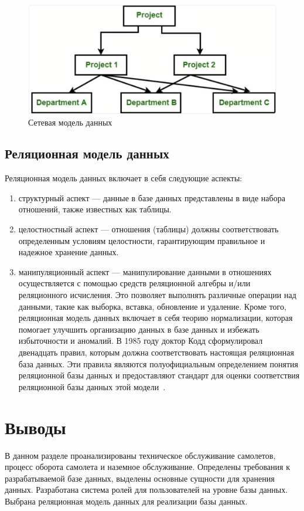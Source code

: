 \begin{enumerate}[label=\arabic*.]
    \begin{figure}[h]
        \begin{center}
            \includegraphics[scale=0.3]{inc/network-model}
            \caption{Сетевая модель данных}
            \label{fig:network-model}
        \end{center}
    \end{figure}
\end{enumerate}

\subsection{Реляционная модель данных}
Реляционная модель данных включает в себя следующие аспекты:

\begin{enumerate}[label=\arabic*)]
    \item структурный аспект --- данные в базе данных представлены в виде набора отношений, также известных как таблицы.
    \item целостностный аспект --- отношения (таблицы) должны соответствовать определенным условиям целостности, гарантирующим правильное и надежное хранение данных.
    \item манипуляционный аспект --- манипулирование данными в отношениях осуществляется с помощью средств реляционной алгебры и/или реляционного исчисления.
    Это позволяет выполнять различные операции над данными, такие как выборка, вставка, обновление и удаление.
    Кроме того, реляционная модель данных включает в себя теорию нормализации, которая помогает улучшить организацию данных в базе данных и избежать избыточности и аномалий.
    В 1985 году доктор Кодд сформулировал двенадцать правил, которым должна соответствовать настоящая реляционная база данных.
    Эти правила являются полуофициальным определением понятия реляционной базы данных и предоставляют стандарт для оценки соответствия реляционной базы данных этой модели~\cite{lekcii}.
\end{enumerate}


\section*{Выводы}
В данном разделе проанализированы техническое обслуживание самолетов, процесс оборота самолета и наземное обслуживание.
Определены требования к разрабатываемой базе данных, выделены основные сущности для хранения данных.
Разработана система ролей для пользователей на уровне базы данных.
Выбрана реляционная модель данных для реализации базы данных.